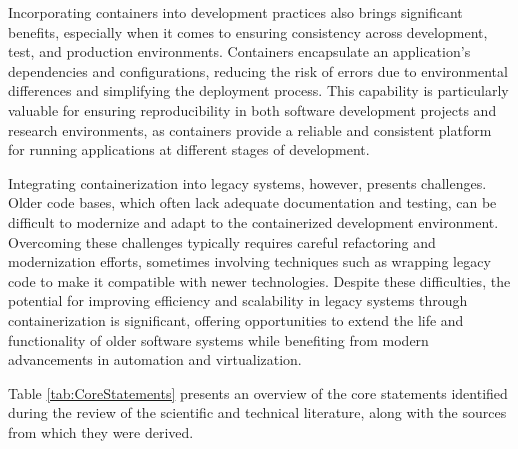 Incorporating containers into development practices also brings significant benefits, especially when it comes to ensuring consistency across development, test, and production environments.
Containers encapsulate an application's dependencies and configurations, reducing the risk of errors due to environmental differences and simplifying the deployment process.
This capability is particularly valuable for ensuring reproducibility in both software development projects and research environments, as containers provide a reliable and consistent platform for running applications at different stages of development.

Integrating containerization into legacy systems, however, presents challenges.
Older code bases, which often lack adequate documentation and testing, can be difficult to modernize and adapt to the containerized development environment.
Overcoming these challenges typically requires careful refactoring and modernization efforts, sometimes involving techniques such as wrapping legacy code to make it compatible with newer technologies.
Despite these difficulties, the potential for improving efficiency and scalability in legacy systems through containerization is significant, offering opportunities to extend the life and functionality of older software systems while benefiting from modern advancements in automation and virtualization.

Table \ref{tab:CoreStatements} presents an overview of the core statements identified during the review of the scientific and technical literature, along with the sources from which they were derived.

